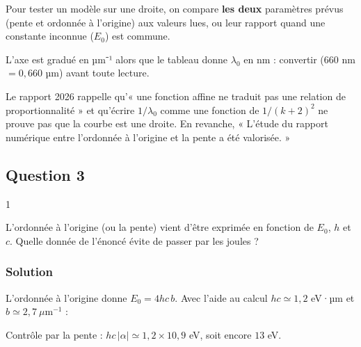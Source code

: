 \documentclass[11pt,a4paper]{article}
\newcommand{\equationajustee}[1]{%
  \sbox{\boiteequation}{$\displaystyle #1$}%
  \ifdim\wd\boiteequation>\linewidth
    \[\resizebox{\linewidth}{!}{\usebox{\boiteequation}}\]%
  \else
    \[#1\]%
  \fi}
\begin{document}
\begin{methode}

Pour tester un modèle sur une droite, on compare \textbf{les deux} paramètres prévus (pente et ordonnée à l'origine) aux valeurs lues, ou leur rapport quand une constante inconnue (\(E_0\)) est commune.

\end{methode}

\begin{piege}

L'axe est gradué en µm⁻¹ alors que le tableau donne \(\lambda_0\) en nm : convertir (\(660\) nm \(=0{,}660\) µm) avant toute lecture.

\end{piege}

\begin{jury}

Le rapport 2026 rappelle qu'« une fonction affine ne traduit pas une relation de proportionnalité » et qu'écrire \(1/\lambda_0\) comme une fonction de \(1/(k+2)^2\) ne prouve pas que la courbe est une droite. En revanche, « L'étude du rapport numérique entre l'ordonnée à l'origine et la pente a été valorisée. »

\end{jury}

\hypertarget{question-3}{%
\subsection{Question 3}\label{question-3}}

\begin{indication}{1}

L'ordonnée à l'origine (ou la pente) vient d'être exprimée en fonction de \(E_0\), \(h\) et \(c\). Quelle donnée de l'énoncé évite de passer par les joules ?

\end{indication}

\hypertarget{solution-2}{%
\subsubsection{Solution}\label{solution-2}}

L'ordonnée à l'origine donne \(E_0=4hc\,b\). Avec l'aide au calcul \(hc\simeq1{,}2\) eV·µm et \(b\simeq2{,}7\ \mu\text{m}^{-1}\) :

\equationajustee{E_0\simeq4\times1{,}2\times2{,}7\ \text{eV}\simeq13\ \text{eV}.}

Contrôle par la pente : \(hc\,|\alpha|\simeq1{,}2\times10{,}9\) eV, soit encore \(13\) eV.
\end{document}
